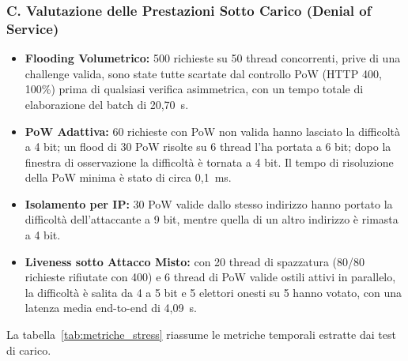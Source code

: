 \documentclass[12pt,a4paper]{article}
\begin{document}
\subsubsection*{C. Valutazione delle Prestazioni Sotto Carico (Denial of Service)}
\begin{itemize}
  \item \textbf{Flooding Volumetrico:} 500 richieste su 50 thread concorrenti, prive di una challenge valida, sono state tutte scartate dal controllo PoW (HTTP 400, 100\%) prima di qualsiasi verifica asimmetrica, con un tempo totale di elaborazione del batch di 20,70~s.
  \item \textbf{PoW Adattiva:} 60 richieste con PoW non valida hanno lasciato la difficoltà a 4 bit; un flood di 30 PoW risolte su 6 thread l'ha portata a 6 bit; dopo la finestra di osservazione la difficoltà è tornata a 4 bit. Il tempo di risoluzione della PoW minima è stato di circa 0,1~ms.
  \item \textbf{Isolamento per IP:} 30 PoW valide dallo stesso indirizzo hanno portato la difficoltà dell'attaccante a 9 bit, mentre quella di un altro indirizzo è rimasta a 4 bit.
  \item \textbf{Liveness sotto Attacco Misto:} con 20 thread di spazzatura (80/80 richieste rifiutate con 400) e 6 thread di PoW valide ostili attivi in parallelo, la difficoltà è salita da 4 a 5 bit e 5 elettori onesti su 5 hanno votato, con una latenza media end-to-end di 4,09~s.
\end{itemize}

La tabella~\ref{tab:metriche_stress} riassume le metriche temporali estratte dai test di carico.
\end{document}

